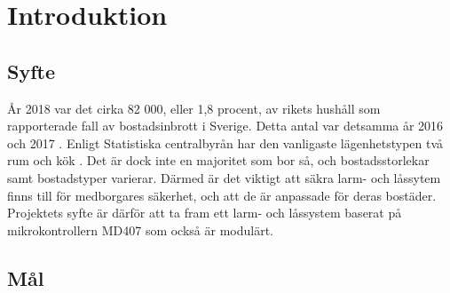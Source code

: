 \section{Introduktion}
\label{sec:intro}

\subsection{Syfte}
\label{sec:syfte}
\setcounter{page}{1} %



År 2018 var det cirka 82 000, eller 1,8 procent, av rikets hushåll som rapporterade fall av bostadsinbrott i Sverige. Detta antal var detsamma år 2016 och 2017 \cite{ntu:2019}. Enligt Statistiska centralbyrån har den vanligaste lägenhetstypen två rum och kök \cite{scb:2018}. Det är dock inte en majoritet som bor så, och bostadsstorlekar samt bostadstyper varierar. 
Därmed är det viktigt att säkra larm- och låssytem finns till för medborgares säkerhet, och att de är anpassade för deras bostäder. 
Projektets syfte är därför att ta fram ett larm- och låssystem baserat på mikrokontrollern MD407 som också är modulärt. 

\subsection{Mål}
\label{sec:mål}


